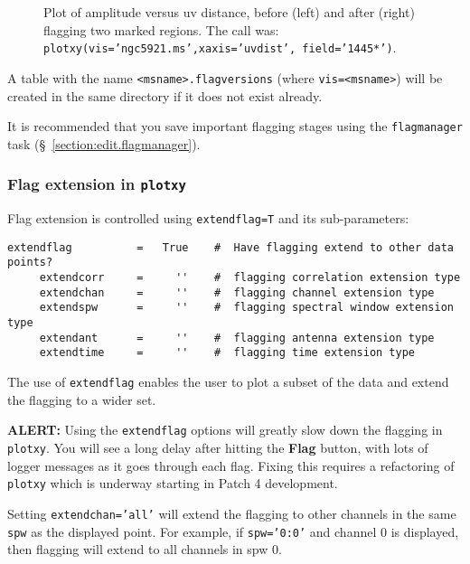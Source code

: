 \begin{figure}[h!]
\begin{center}
\caption{\label{fig:markflags.plotxy} Plot of amplitude versus
uv distance, before (left) and after (right) flagging two marked regions.
The call was:
{\tt plotxy(vis='ngc5921.ms',xaxis='uvdist', field='1445*')}.
}
\hrulefill
\end{center}
\end{figure}

A table with the name {\tt <msname>.flagversions} (where
{\tt vis=<msname>}) will be created in the same directory if
it does not exist already.

It is recommended that you save important flagging stages using
the {\tt flagmanager} task (\S~\ref{section:edit.flagmanager}).

\subsubsection{Flag extension in {\tt plotxy}}
\label{section:edit.plot.plotxy.extend}

Flag extension is controlled using {\tt extendflag=T} and its sub-parameters:
\small
\begin{verbatim}
extendflag          =   True    #  Have flagging extend to other data points?
     extendcorr     =     ''    #  flagging correlation extension type
     extendchan     =     ''    #  flagging channel extension type
     extendspw      =     ''    #  flagging spectral window extension type
     extendant      =     ''    #  flagging antenna extension type
     extendtime     =     ''    #  flagging time extension type
\end{verbatim}
\normalsize
The use of {\tt extendflag} enables the user to plot a subset of the
data and extend the flagging to a wider set.

{\bf ALERT:} Using the {\tt extendflag} options will greatly
slow down the flagging in {\tt plotxy}.  You will see a long delay
after hitting the {\bf Flag} button, with lots of logger messages
as it goes through each flag.  Fixing this requires a refactoring
of {\tt plotxy} which is underway starting in Patch 4 development.

Setting {\tt extendchan='all'} will extend the flagging to other
channels in the same {\tt spw} as the displayed point.  For example,
if {\tt spw='0:0'} and channel 0 is displayed, then flagging will
extend to all channels in spw 0.

